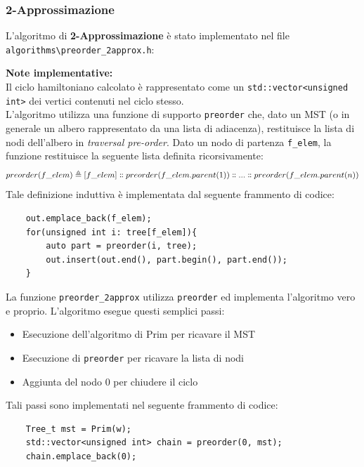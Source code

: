 \documentclass[]{article}
\begin{document}
\newpage
\subsubsection{2-Approssimazione}
\begin{flushleft}
L'algoritmo di \textbf{2-Approssimazione} è stato implementato nel file \verb|algorithms\preorder_2approx.h|:
\lstset{language=c++, style=mystyle}


\textbf{Note implementative:}\\
Il ciclo hamiltoniano calcolato è rappresentato come un \verb|std::vector<unsigned int>| dei vertici contenuti nel ciclo stesso.\\
L'algoritmo utilizza una funzione di supporto \verb|preorder| che, dato un MST (o in generale un albero rappresentato da una lista di adiacenza), restituisce la lista di nodi dell'albero in \textit{traversal pre-order}.
Dato un nodo di partenza \verb|f_elem|, la funzione restituisce la seguente lista definita ricorsivamente:
$$preorder(f\_elem) \triangleq [f\_elem] \dblcolon preorder(f\_elem.parent(1)) \dblcolon ... \dblcolon preorder(f\_elem.parent(n))$$
Tale definizione induttiva è implementata dal seguente frammento di codice:
\lstset{language=c++, style=mystyle, firstnumber=4}
\begin{lstlisting}
	out.emplace_back(f_elem);
	for(unsigned int i: tree[f_elem]){
		auto part = preorder(i, tree);
		out.insert(out.end(), part.begin(), part.end());
	}
\end{lstlisting}
La funzione \verb|preorder_2approx| utilizza \verb|preorder| ed implementa l'algoritmo vero e proprio.
L'algoritmo esegue questi semplici passi:
\begin{itemize}
	\item Esecuzione dell'algoritmo di Prim per ricavare il MST
	\item Esecuzione di \verb|preorder| per ricavare la lista di nodi
	\item Aggiunta del nodo 0 per chiudere il ciclo
\end{itemize}
Tali passi sono implementati nel seguente frammento di codice:
\lstset{language=c++, style=mystyle, firstnumber=13}
\begin{lstlisting}
	Tree_t mst = Prim(w);
	std::vector<unsigned int> chain = preorder(0, mst);
	chain.emplace_back(0);
\end{lstlisting}
\end{flushleft}
\newpage
\end{document}
